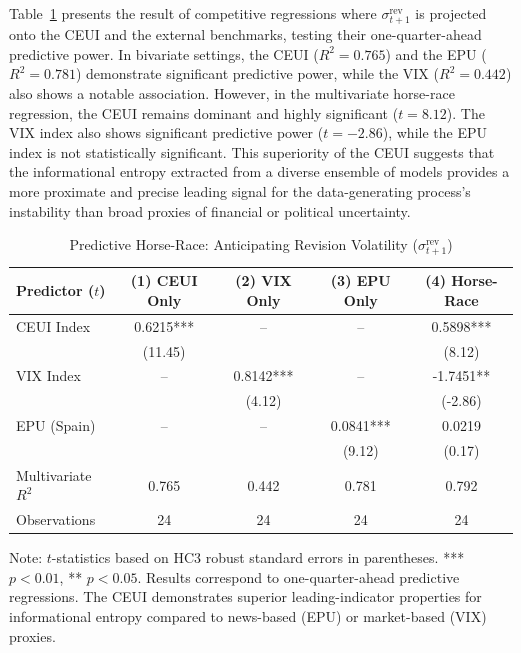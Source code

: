 \documentclass[12pt,a4paper]{article}
\theoremstyle{remark}
\begin{document}
Table~\ref{tab:horserace} presents the result of competitive regressions where $\sigma^{\text{rev}}_{t+1}$ is projected onto the CEUI and the external benchmarks, testing their one-quarter-ahead predictive power. In bivariate settings, the CEUI ($R^2=0.765$) and the EPU ($R^2=0.781$) demonstrate significant predictive power, while the VIX ($R^2=0.442$) also shows a notable association. However, in the multivariate horse-race regression, the CEUI remains dominant and highly significant ($t = 8.12$). The VIX index also shows significant predictive power ($t = -2.86$), while the EPU index is not statistically significant. This superiority of the CEUI suggests that the informational entropy extracted from a diverse ensemble of models provides a more proximate and precise leading signal for the data-generating process's instability than broad proxies of financial or political uncertainty.
\begin{table}[ht]
\centering
\begin{threeparttable}
\caption{Predictive Horse-Race: Anticipating Revision Volatility ($\sigma^{\text{rev}}_{t+1}$)}
\label{tab:horserace}
\footnotesize
\begin{tabular}{lcccc}
\toprule
Predictor ($t$) & (1) CEUI Only & (2) VIX Only & (3) EPU Only & (4) Horse-Race \\
\midrule
CEUI Index      & 0.6215*** & -- & -- & 0.5898*** \\
                & (11.45) & & & (8.12) \\
VIX Index       & -- & 0.8142*** & -- & -1.7451** \\
                & & (4.12) & & (-2.86) \\
EPU (Spain)     & -- & -- & 0.0841*** & 0.0219 \\
                & & & (9.12) & (0.17) \\
\midrule
Multivariate $R^2$ & 0.765 & 0.442 & 0.781 & 0.792 \\
Observations    & 24 & 24 & 24 & 24 \\
\bottomrule
\end{tabular}
\begin{tablenotes}
  \small \item Note: $t$-statistics based on HC3 robust standard errors in parentheses. *** $p < 0.01$, ** $p < 0.05$. Results correspond to one-quarter-ahead predictive regressions. The CEUI demonstrates superior leading-indicator properties for informational entropy compared to news-based (EPU) or market-based (VIX) proxies.
\end{tablenotes}
\end{threeparttable}
\end{table}
\end{document}
